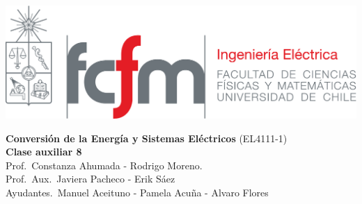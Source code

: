 \documentclass[
  11pt,
  letterpaper,
   addpoints,
   answers
  ]{exam}
\begin{document}
\noindent
\begin{minipage}{0.47\textwidth}
\includegraphics[width=\textwidth]{../fcfm_die}
\end{minipage}
\begin{minipage}{0.53\textwidth}
\begin{center} 
\large\textbf{Conversión de la Energía y Sistemas Eléctricos } (EL4111-1) \\
\large\textbf{Clase auxiliar 8} \\
\small Prof.~Constanza Ahumada - Rodrigo Moreno.\\
\small Prof.~Aux.~Javiera Pacheco - Erik Sáez\\
\small Ayudantes.~Manuel Aceituno - Pamela Acuña - Alvaro Flores\\
\end{center}
\end{minipage}
\end{document}
